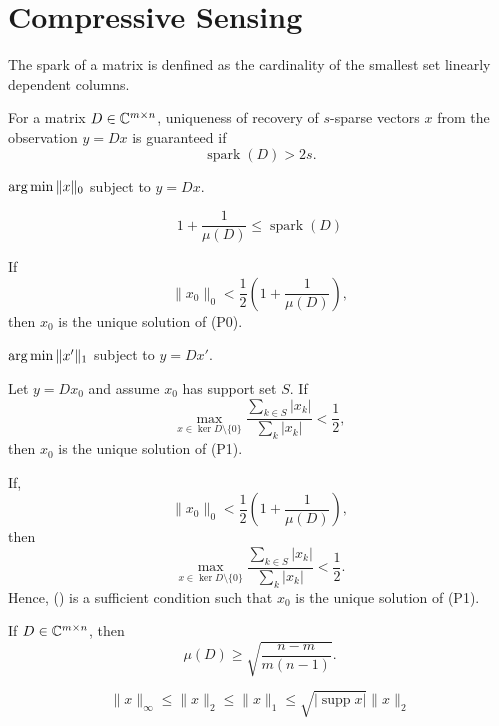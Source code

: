 \newpage
\section{Compressive Sensing}

\begin{boxdefinition}[Spark]
    The spark of a matrix is denfined as the cardinality
    of the smallest set linearly dependent columns.
\end{boxdefinition}

\begin{boxtheorem}
    For a matrix $D\in\mathbb{C}^{m\times n}$, uniqueness of 
    recovery of $s$-sparse vectors $x$ from the 
    observation $y=Dx$ is guaranteed if 
    $${\operatorname{spark}(D)}>2s.$$
\end{boxtheorem}

\begin{boxdefinition}[P0]
    $\operatorname*{arg\,min} \|x\|_0$ subject to $y=Dx$.
\end{boxdefinition}

\begin{boxtheorem}
    $$
    1+\frac{1}{\mu(D)}\leq\operatorname{spark}(D)
    $$
\end{boxtheorem}

\begin{boxtheorem}
    If 
    $$
    \|x_0\|_0<\frac{1}{2}\left(1+\frac{1}{\mu(D)}\right),
    $$
    then $x_0$ is the unique solution of (P0).
\end{boxtheorem}

\begin{boxdefinition}[P1]
    $\operatorname*{arg\,min} \|x'\|_1$ subject to $y =Dx'$.
\end{boxdefinition}

\begin{boxtheorem}
    Let $y=Dx_0$ and assume $x_0$ has support set $S$.
    If 
    $$
    \max_{x\in\ker D\setminus\{0\}}
    \frac{\sum_{k\in S}|x_k|}{\sum_k|x_k|}<\frac{1}{2},
    $$
    then $x_0$ is the unique solution of (P1).
\end{boxtheorem}

\begin{boxtheorem}
    If,
    \begin{equation}
    \label{a}
    \|x_0\|_0<\frac{1}{2}\left(1+\frac{1}{\mu(D)}\right),
    \end{equation}
    then 
    $$
    \max_{x\in\ker D\setminus\{0\}}
    \frac{\sum_{k\in S}|x_k|}{\sum_k|x_k|}<\frac{1}{2}
    .$$
    Hence, () is a sufficient condition 
    such that $x_0$ is the unique solution of (P1).
\end{boxtheorem}

\begin{boxtheorem}
    If $D\in \mathbb{C}^{m\times n}$, then
    $$
    \mu(D)  \geq \sqrt{\frac{n-m}{m(n-1)}}.
    $$
\end{boxtheorem}

\begin{boxtheorem}
    $$\|x\|_\infty\leq\|x\|_2\leq\|x\|_1
    \leq\sqrt{|\operatorname{supp}x|}\|x\|_2$$
\end{boxtheorem}